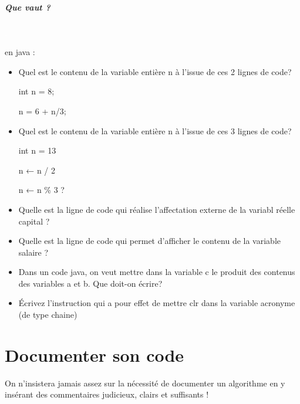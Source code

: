\documentclass[11pt,a4paper]{article}
\begin{document}
			
		\subparagraph{Que vaut ?} 
		
                \textcolor{white}{.} \par
            
							  en java :
							
					\begin{itemize}
				
			\item Quel est le contenu de la variable enti\`ere n \`a l'issue de ces 2 lignes de code?\par
				
                    int n = 8;\par
				
                    n = 6 + n/3;\par
				 \textcolor{gray}{\underline{\hspace*{1em}}} 
			\item Quel est le contenu de la variable enti\`ere n \`a l'issue de ces 3 lignes de code?\par
				
                    int n = 13\par
				
                    n ← n / 2\par
				
                    n ← n \% 3 ?\par
				 \textcolor{gray}{\underline{\hspace*{1em}}} 
			\item Quelle est la ligne de code qui r\'ealise l'affectation externe de la variabl r\'eelle capital ? \textcolor{gray}{\underline{\hspace*{16em}}} 
			\item Quelle est la ligne de code qui permet d'afficher le contenu de la variable salaire ? \textcolor{gray}{\underline{\hspace*{16em}}} 
			\item Dans un code java, on veut mettre dans la variable c le produit des contenus des
									  variables a et b. Que doit-on \'ecrire? \textcolor{gray}{\underline{\hspace*{10em}}} 
			\item \'Ecrivez l'instruction qui a pour effet de mettre clr dans la variable acronyme (de type chaine)  \textcolor{gray}{\underline{\hspace*{16em}}} 
					\end{itemize}
				\section{Documenter son code}
				On n'insistera jamais assez sur la n\'ecessit\'e de documenter un algorithme en y ins\'erant 
        des commentaires judicieux, clairs et suffisants !
      
\end{document}
